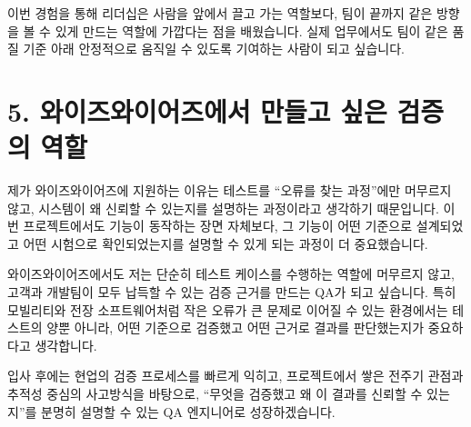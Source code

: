 \documentclass[11pt]{article}
\begin{document}
이번 경험을 통해 리더십은 사람을 앞에서 끌고 가는 역할보다, 팀이 끝까지 같은 방향을 볼 수 있게 만드는 역할에 가깝다는 점을 배웠습니다. 실제 업무에서도 팀이 같은 품질 기준 아래 안정적으로 움직일 수 있도록 기여하는 사람이 되고 싶습니다.

\section*{5. 와이즈와이어즈에서 만들고 싶은 검증의 역할}
제가 와이즈와이어즈에 지원하는 이유는 테스트를 ``오류를 찾는 과정''에만 머무르지 않고, 시스템이 왜 신뢰할 수 있는지를 설명하는 과정이라고 생각하기 때문입니다. 이번 프로젝트에서도 기능이 동작하는 장면 자체보다, 그 기능이 어떤 기준으로 설계되었고 어떤 시험으로 확인되었는지를 설명할 수 있게 되는 과정이 더 중요했습니다.

와이즈와이어즈에서도 저는 단순히 테스트 케이스를 수행하는 역할에 머무르지 않고, 고객과 개발팀이 모두 납득할 수 있는 검증 근거를 만드는 QA가 되고 싶습니다. 특히 모빌리티와 전장 소프트웨어처럼 작은 오류가 큰 문제로 이어질 수 있는 환경에서는 테스트의 양뿐 아니라, 어떤 기준으로 검증했고 어떤 근거로 결과를 판단했는지가 중요하다고 생각합니다.

입사 후에는 현업의 검증 프로세스를 빠르게 익히고, 프로젝트에서 쌓은 전주기 관점과 추적성 중심의 사고방식을 바탕으로, ``무엇을 검증했고 왜 이 결과를 신뢰할 수 있는지''를 분명히 설명할 수 있는 QA 엔지니어로 성장하겠습니다.
\end{document}
